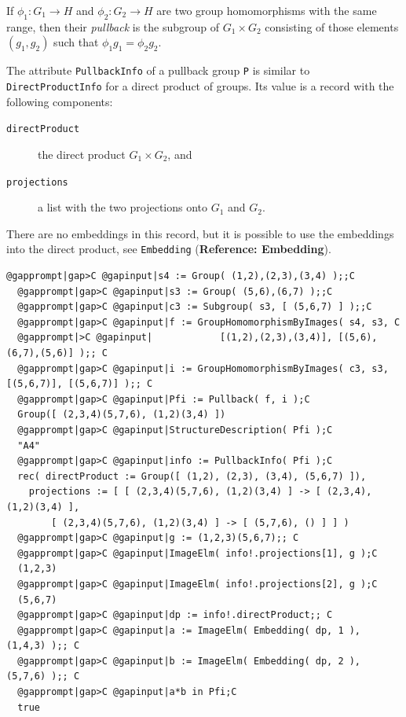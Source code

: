 \documentclass[a4paper,11pt]{report}
\begin{document}
{{{ If $\phi_1 : G_1 \to H$ and $\phi_2 : G_2 \to H$ are two group homomorphisms with the same range, then their \emph{pullback} is the subgroup of $G_1 \times G_2$ consisting of those elements $(g_1,g_2)$ such that $\phi_1 g_1 = \phi_2 g_2$. 

 The attribute \texttt{PullbackInfo} of a pullback group \texttt{P} is similar to \texttt{DirectProductInfo} for a direct product of groups. Its value is a record with the following
components: 

 
\begin{description}
\item[{\texttt{directProduct}}]  the direct product $G_1 \times G_2$, and 
\item[{\texttt{projections}}]  a list with the two projections onto $G_1$ and $G_2$. 
\end{description}
 There are no embeddings in this record, but it is possible to use the
embeddings into the direct product, see \texttt{Embedding} (\textbf{Reference: Embedding}). 

 
\begin{Verbatim}[commandchars=@|C,fontsize=\small,frame=single,label=Example]
  @gapprompt|gap>C @gapinput|s4 := Group( (1,2),(2,3),(3,4) );;C
  @gapprompt|gap>C @gapinput|s3 := Group( (5,6),(6,7) );;C
  @gapprompt|gap>C @gapinput|c3 := Subgroup( s3, [ (5,6,7) ] );;C
  @gapprompt|gap>C @gapinput|f := GroupHomomorphismByImages( s4, s3, C
  @gapprompt|>C @gapinput|            [(1,2),(2,3),(3,4)], [(5,6),(6,7),(5,6)] );; C
  @gapprompt|gap>C @gapinput|i := GroupHomomorphismByImages( c3, s3, [(5,6,7)], [(5,6,7)] );; C
  @gapprompt|gap>C @gapinput|Pfi := Pullback( f, i );C
  Group([ (2,3,4)(5,7,6), (1,2)(3,4) ])
  @gapprompt|gap>C @gapinput|StructureDescription( Pfi );C
  "A4"
  @gapprompt|gap>C @gapinput|info := PullbackInfo( Pfi );C
  rec( directProduct := Group([ (1,2), (2,3), (3,4), (5,6,7) ]), 
    projections := [ [ (2,3,4)(5,7,6), (1,2)(3,4) ] -> [ (2,3,4), (1,2)(3,4) ], 
        [ (2,3,4)(5,7,6), (1,2)(3,4) ] -> [ (5,7,6), () ] ] )
  @gapprompt|gap>C @gapinput|g := (1,2,3)(5,6,7);; C
  @gapprompt|gap>C @gapinput|ImageElm( info!.projections[1], g );C
  (1,2,3)
  @gapprompt|gap>C @gapinput|ImageElm( info!.projections[2], g );C
  (5,6,7) 
  @gapprompt|gap>C @gapinput|dp := info!.directProduct;; C
  @gapprompt|gap>C @gapinput|a := ImageElm( Embedding( dp, 1 ), (1,4,3) );; C
  @gapprompt|gap>C @gapinput|b := ImageElm( Embedding( dp, 2 ), (5,7,6) );; C
  @gapprompt|gap>C @gapinput|a*b in Pfi;C
  true
\end{Verbatim}
 }

}}
\end{document}
